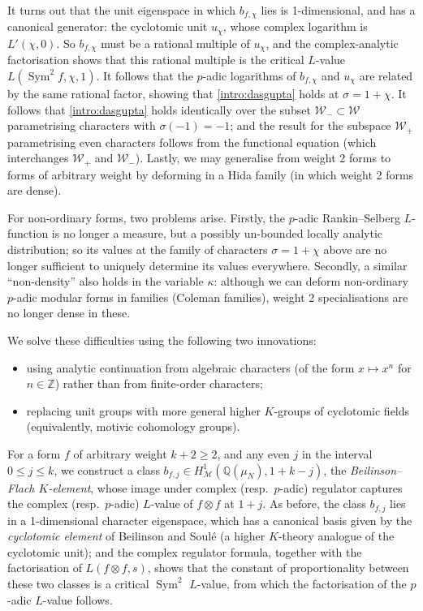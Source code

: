 \documentclass[11pt, a4paper, reqno]{amsart}
\theoremstyle{definition}
\theoremstyle{plain}
\theoremstyle{remark}
\DeclareMathOperator{\Sym}{Sym}
\DeclareMathOperator{\mot}{\mathscr{M}}
\newcommand{\numberset}{\mathbb}
\newcommand{\Q}{\numberset{Q}}
\newcommand{\Z}{\numberset{Z}}
\newcommand{\Weight}{\mathcal{W}}
\renewcommand{\ge}{\geqslant}
\renewcommand{\le}{\leqslant}
\begin{document}
  It turns out that the unit eigenspace in which $b_{f, \chi}$ lies is 1-dimensional, and has a canonical generator: the cyclotomic unit $u_\chi$, whose complex logarithm is $L'(\chi, 0)$. So $b_{f, \chi}$ must be a rational multiple of $u_{\chi}$, and the complex-analytic factorisation shows that this rational multiple is the critical $L$-value $L(\Sym^2 f, \chi, 1)$. It follows that the $p$-adic logarithms of $b_{f, \chi}$ and $u_{\chi}$ are related by the same rational factor, showing that \eqref{intro:dasgupta} holds at $\sigma = 1 + \chi$. It follows that \eqref{intro:dasgupta} holds identically over the subset $\Weight_- \subset \Weight$ parametrising characters with $\sigma(-1) = -1$; and the result for the subspace $\Weight_+$ parametrising even characters follows from the functional equation (which interchanges $\Weight_+$ and $\Weight_-$). Lastly, we may generalise from weight 2 forms to forms of arbitrary weight by deforming in a Hida family (in which weight 2 forms are dense).

  For non-ordinary forms, two problems arise. Firstly, the $p$-adic Rankin--Selberg $L$-function is no longer a measure, but a possibly un-bounded locally analytic distribution; so its values at the family of characters $\sigma = 1 + \chi$ above are no longer sufficient to uniquely determine its values everywhere. Secondly, a similar ``non-density'' also holds in the variable $\kappa$: although we can deform non-ordinary $p$-adic modular forms in families (Coleman families), weight 2 specialisations are no longer dense in these.

  We solve these difficulties using the following two innovations:
  \begin{itemize}
   \item using analytic continuation from algebraic characters (of the form $x \mapsto x^n$ for $n \in \Z$) rather than from finite-order characters;
   \item replacing unit groups with more general higher $K$-groups of cyclotomic fields (equivalently, motivic cohomology groups).
  \end{itemize}

  For a form $f$ of arbitrary weight $k + 2 \ge 2$, and any even $j$ in the interval $0 \le j \le k$, we construct a class $b_{f, j} \in H^1_{\mot}(\Q(\mu_N), 1 + k - j)$, the \emph{Beilinson--Flach $K$-element}, whose image under complex (resp.~$p$-adic) regulator captures the complex (resp.~$p$-adic) $L$-value of $f \otimes f$ at $1 + j$. As before, the class $b_{f, j}$ lies in a 1-dimensional character eigenspace, which has a canonical basis given by the \emph{cyclotomic element} of Beilinson and Soul\'e (a higher $K$-theory analogue of the cyclotomic unit); and the complex regulator formula, together with the factorisation of $L(f \otimes f, s)$, shows that the constant of proportionality between these two classes is a critical $\Sym^2$ $L$-value, from which the factorisation of the $p$-adic $L$-value follows.
\end{document}
